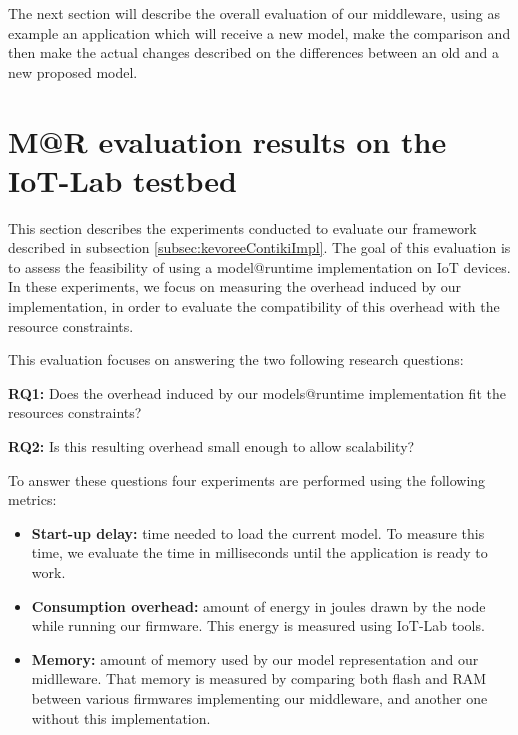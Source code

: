 The next section will describe the  overall evaluation of our middleware, using as example an application which will receive a new model, make the comparison and then make the actual changes described on the differences between an old and a new proposed model.

\section{M@R evaluation results on the IoT-Lab testbed}
This section describes the experiments conducted to evaluate our framework described in subsection \ref{subsec:kevoreeContikiImpl}.
The goal of this evaluation is to assess the feasibility of using a model@runtime implementation on IoT devices.
In these experiments, we focus on measuring the overhead induced by our implementation, in order to evaluate the compatibility of this overhead with the resource constraints.


This evaluation focuses on answering the two following research questions:

\textbf{RQ1:} Does the overhead induced by our models@runtime implementation fit the resources constraints?

\textbf{RQ2:} Is this resulting overhead small enough to allow scalability?


To answer these questions four experiments are performed using the following metrics:
\begin{itemize}
	\item \textbf{Start-up delay:} time needed to load the current model. To measure this time, we evaluate the time in milliseconds until the application is ready to work.
	\item \textbf{Consumption overhead:} amount of energy in joules drawn by the node while running our firmware.
	This energy is measured using IoT-Lab tools. 
	\item \textbf{Memory:} amount of memory used by our model representation and our midlleware.
	That memory is measured by comparing both flash and RAM between various firmwares implementing our middleware, and another one without this implementation.
\end{itemize}

